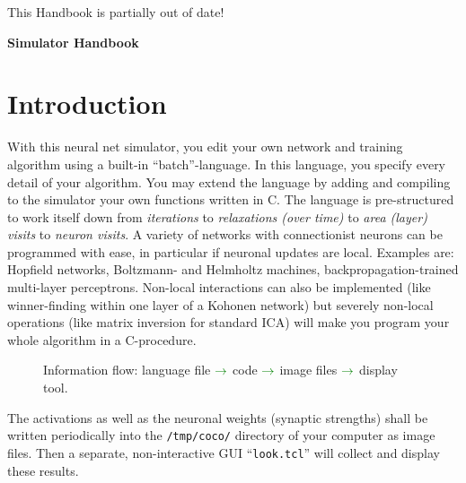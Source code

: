 \documentclass[12pt]{article}
\begin{document}
\selectfont
\renewcommand{\rmdefault}{phv}

{\color{red} \begin{center} This Handbook is partially out of date! \end{center} }
\tableofcontents

\clearpage

\begin{center}
{\huge \bf Simulator Handbook}
\end{center}

\section{Introduction}

With this neural net simulator, you edit your own network and training algorithm using a built-in ``batch''-language.
In this language, you specify every detail of your algorithm.
You may extend the language by adding and compiling to the simulator your own functions written in C.
The language is pre-structured to work itself down
from {\sl iterations} to {\sl relaxations (over time)} to {\sl area (layer) visits} to {\sl neuron visits}.
A variety of networks with connectionist neurons can be programmed with ease, in particular if neuronal updates are local.
Examples are: Hopfield networks, Boltzmann- and Helmholtz machines, backpropagation-trained multi-layer perceptrons.
Non-local interactions can also be implemented (like winner-finding within one layer of a Kohonen network)
but severely non-local operations (like matrix inversion for standard ICA) will make you program your whole algorithm in a C-procedure.

 \begin{figure}[htb]
 \begin{center}
 \end{center}
 \vspace*{-7mm}
 \caption{Information flow: language file ${\color{mygreen}\rightarrow}$ code ${\color{mygreen}\rightarrow}$ image files ${\color{mygreen}\rightarrow}$ display tool.}
 \label{informationflow}
 \end{figure}

The activations as well as the neuronal weights (synaptic strengths) shall be written periodically into the \texttt{/tmp/coco/} directory of your computer as image files.
Then a separate, non-interactive GUI ``\texttt{look.tcl}'' will collect and display these results.
\end{document}
